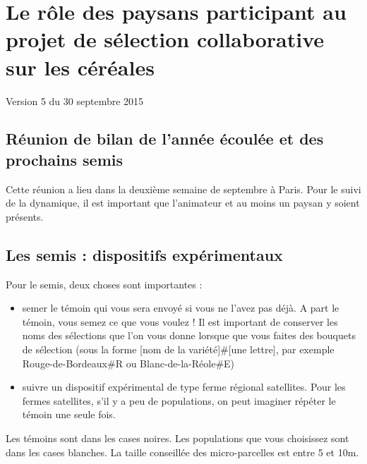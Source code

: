 \chapter{Le rôle des paysans participant au projet de sélection collaborative sur les céréales}

\begin{center}
\Large Version 5 du 30 septembre 2015
\end{center}


\section{Réunion de bilan de l'année écoulée et des prochains semis}
Cette réunion a lieu dans la deuxième semaine de septembre à Paris. Pour le suivi de la dynamique,
il est important que l'animateur et au moins un paysan y soient présents.

\section{Les semis : dispositifs expérimentaux}




Pour le semis, deux choses sont importantes :

\begin{itemize}
\item semer le témoin qui vous sera envoyé si vous ne l'avez pas déjà. A part le témoin, vous
semez ce que vous voulez ! Il est important de conserver les noms des sélections que l'on
vous donne lorsque que vous faites des bouquets de sélection (sous la forme [nom de la
variété]\#[une lettre], par exemple Rouge-de-Bordeaux\#R ou Blanc-de-la-Réole\#E)

\item suivre un dispositif expérimental de type ferme régional  satellites.
Pour les fermes satellites, s'il y a peu de populations, on peut imaginer répéter le témoin une seule fois.
\end{itemize}

Les témoins sont dans les cases noires. Les populations que vous choisissez sont dans les cases
blanches. 
La taille conseillée des micro-parcelles est entre 5 et 10m.
 \\


